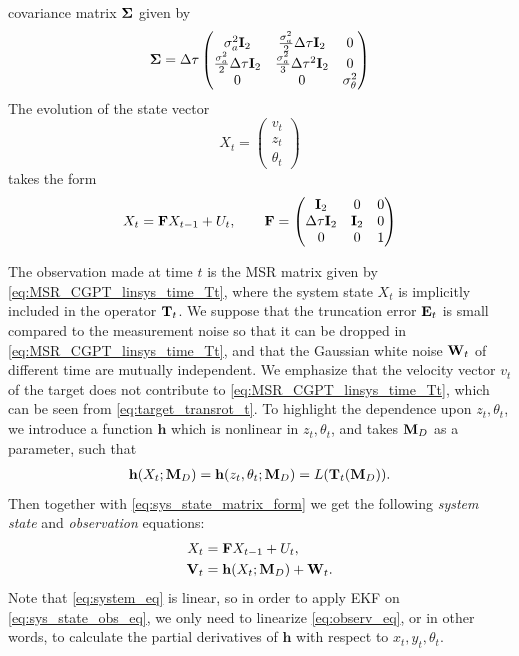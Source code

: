  covariance matrix $\mathbf{\Sigma}$ given by
 \begin{equation} \label{eq:noise_cov_matrix}
 \mathbf{\Sigma}= \Delta \tau
 \begin{pmatrix}
 \sigma_a^2 {\bf I}_2 & \frac{\sigma_a^2}{2} \Delta \tau {\bf I}_2 &0\\
 \frac{\sigma_a^2}{2} \Delta \tau {\bf I}_2 & \frac{\sigma_a^2}{3} \Delta \tau^2 {\bf I}_2 & 0\\
 0 & 0 & \sigma_\theta^2
 \end{pmatrix}
 \end{equation}
 The evolution of the state vector
 $$
 X_t =
 \begin{pmatrix}
 {v}_t\\
 {z}_t\\
 \theta_t
 \end{pmatrix}
 $$
 takes the form
 \begin{equation} \label{eq:sys_state_matrix_form}
 X_t = \mathbf{F} X_{t-1} + U_{t}, \quad \quad
 \mathbf{F}=
 \begin{pmatrix}
 \mathbf{I}_2 & 0 & 0\\
 \Delta \tau \mathbf{I}_2 & \mathbf{I}_2 & 0 \\
 0 & 0 & 1
 \end{pmatrix}
 \end{equation}




The observation made at time $t$ is the MSR matrix given by
\eqref{eq:MSR_CGPT_linsys_time_Tt}, where the system state $X_t$
is implicitly included in the operator $\mathbf{T}_t$. We suppose that
the truncation error $\mathbf{E}_t$ is small compared to the measurement
noise so that it can be dropped in
\eqref{eq:MSR_CGPT_linsys_time_Tt}, and that the Gaussian white
noise $\mathbf{W}_t$ of different time are mutually independent. We
emphasize that the velocity vector $v_t$ of the target does not
contribute to \eqref{eq:MSR_CGPT_linsys_time_Tt}, which can be
seen from \eqref{eq:target_transrot_t}. To highlight the
dependence upon $z_t, \theta_t$, we introduce a function
$\mathbf{h}$ which is nonlinear in $z_t, \theta_t$, and takes
$\mathbf{M}_D$ as a parameter, such that
\begin{align}
  \label{eq:linsys_func_h}
  \mathbf{h}(X_t; \mathbf{M}_D) = \mathbf{h}(z_t, \theta_t;\mathbf{M}_D) = L(\mathbf{T}_t(\mathbf{M}_D)).
\end{align}
Then together with \eqref{eq:sys_state_matrix_form} we get the following \emph{system state} and
\emph{observation} equations:
\begin{subequations}
  \label{eq:sys_state_obs_eq}
  \begin{align}
      X_t &= \mathbf{F} X_{t-1} + U_t , \label{eq:system_eq} \\
      \mathbf{V}_t &= \mathbf{h}(X_t; \mathbf{M}_D) + \mathbf{W}_t .\label{eq:observ_eq}
  \end{align}
\end{subequations}
Note that \eqref{eq:system_eq} is linear, so in order to apply EKF
on \eqref{eq:sys_state_obs_eq}, we only need to linearize
\eqref{eq:observ_eq}, or in other words, to calculate the partial
derivatives of $\mathbf{h}$ with respect to $x_t, y_t, \theta_t$.

